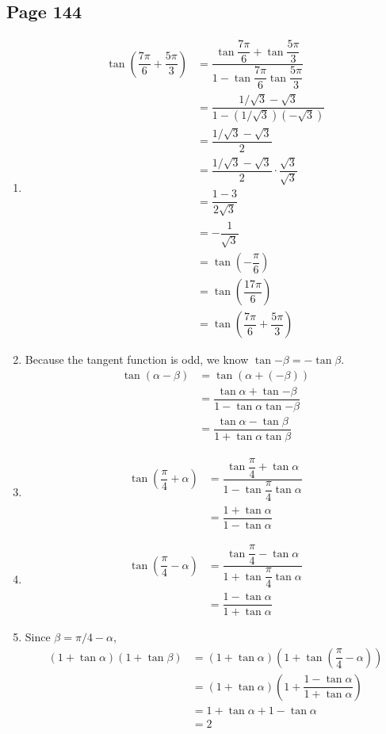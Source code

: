 \documentclass{article}
\newenvironment{solutions}[1]
{\subsection*{#1}
 \begin{enumerate}[leftmargin=1.5em]}
{\end{enumerate}}
\newcommand{\solution}{\item}
\begin{document}
\begin{solutions}{Page 144}
\solution %
\begin{align*}
\tan\left(\dfrac{7\pi}{6}+\dfrac{5\pi}{3}\right) &= \dfrac{\tan{\dfrac{7\pi}{6}} + \tan{\dfrac{5\pi}{3}}}{1-\tan{\dfrac{7\pi}{6}}  \tan{\dfrac{5\pi}{3}}} \\
&= \dfrac{1/\sqrt{3} - \sqrt{3}}{1-\left(1/\sqrt{3}\right)\left(-\sqrt{3}\right)} \\
&= \dfrac{1/\sqrt{3} - \sqrt{3}}{2} \\
&= \dfrac{1/\sqrt{3} - \sqrt{3}}{2} \cdot \dfrac{\sqrt{3}}{\sqrt{3}}\\
&= \dfrac{1 - 3}{2\sqrt{3}} \\
&= -\dfrac{1}{\sqrt{3}} \\
&= \tan\left(-\dfrac{\pi}{6}\right) \\
&= \tan\left(\dfrac{17\pi}{6}\right) \\
&= \tan\left(\dfrac{7\pi}{6} + \dfrac{5\pi}{3}\right)
\end{align*}

\solution %
Because the tangent function is odd, we know $\tan{-\beta}=-\tan{\beta}$.
\begin{align*}
\tan\left(\alpha-\beta\right) &= \tan\left(\alpha + \left(-\beta\right)\right) \\
&= \dfrac{\tan{\alpha} + \tan{-\beta}}{1-\tan{\alpha}  \tan{-\beta}} \\
&= \dfrac{\tan{\alpha} - \tan{\beta}}{1+\tan{\alpha}  \tan{\beta}}
\end{align*}

\solution %
\begin{align*}
\tan\left(\dfrac{\pi}{4}+\alpha\right) &= \dfrac{\tan{\dfrac{\pi}{4}} + \tan{\alpha}}{1-\tan{\dfrac{\pi}{4}}  \tan{\alpha}} \\
&= \dfrac{1 + \tan{\alpha}}{1 - \tan{\alpha}}
\end{align*}

\solution %
\begin{align*}
\tan\left(\dfrac{\pi}{4}-\alpha\right) &= \dfrac{\tan{\dfrac{\pi}{4}} - \tan{\alpha}}{1+\tan{\dfrac{\pi}{4}}  \tan{\alpha}} \\
&= \dfrac{1 - \tan{\alpha}}{1 + \tan{\alpha}}
\end{align*}

\solution %
Since $\beta = \pi/4 - \alpha$,
\begin{align*}
\left(1+\tan{\alpha}\right)\left(1+\tan{\beta}\right) &= \left(1+\tan{\alpha}\right)\left(1+\tan\left(\dfrac{\pi}{4}-\alpha\right)\right) \\
&= \left(1 + \tan{\alpha}\right) \left(1 + \dfrac{1 - \tan{\alpha}}{1 + \tan{\alpha}}\right) \\
&= 1 + \tan{\alpha} + 1 - \tan{\alpha} \\
&= 2
\end{align*}


\end{solutions}
\end{document}
